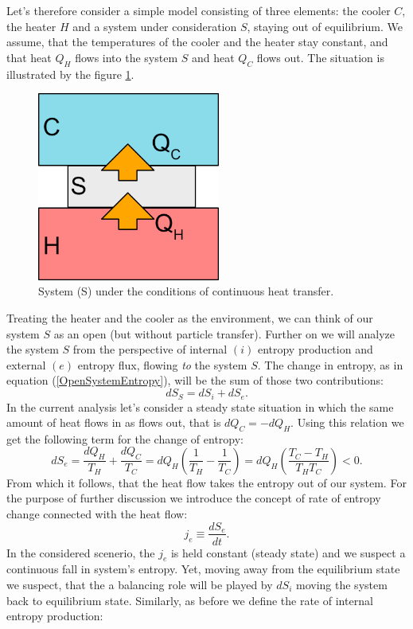 \documentclass[a4paper,12pt]{article}
\begin{document}
Let's therefore consider a simple model consisting of three elements: the cooler $C$, the heater $H$ and a system under consideration $S$, staying out of equilibrium.
We assume, that the temperatures of the cooler and the heater stay constant, and that heat $Q_H$ flows into the system $S$ and heat $Q_C$ flows out. The situation is illustrated by the figure \ref{Fig2}.
\begin{figure}[ht!]
\centering \includegraphics[width=6cm]{system} \caption{System (S) under the conditions of continuous heat transfer.}
\label{Fig2} 
\end{figure}
Treating the heater and the cooler as the environment, we can think of our system $S$ as an open (but without particle transfer).
Further on we will analyze the system $S$ from the perspective of internal $(i)$ entropy production and external $(e)$ entropy flux, flowing \emph{to} the system $S$. 
The change in entropy, as in equation (\ref{OpenSystemEntropy}), will be the sum of those two contributions:
\begin{equation}
dS_S=dS_i+dS_e.
\label{entrosum}
\end{equation}
In the current analysis let's consider a steady state situation in which the same amount of heat flows in as flows out, that is $dQ_C=-dQ_H$. Using this relation we get the following term for the change of entropy:
\begin{equation}
dS_e=\frac{dQ_H}{T_H}+\frac{dQ_C}{T_C}=dQ_H\left(\frac{1}{T_H}-\frac{1}{T_C}\right)
=dQ_H\left(\frac{T_C-T_H}{T_HT_C}\right)<0.
\label{dSe1}
\end{equation}
From which it follows, that the heat flow takes the entropy out of our system.
For the purpose of further discussion we introduce the concept of rate of entropy change connected with the heat flow:
\begin{equation}
j_e \equiv  \frac{dS_e}{dt}. 
\end{equation}
In the considered scenerio, the $j_e$ is held constant (steady state) and we suspect a continuous fall in system's entropy. Yet, moving away from the equilibrium state we suspect, that the a balancing role will be played by $dS_i$ moving the system back to equilibrium state. Similarly, as before we define the rate of internal entropy production:
\end{document}
